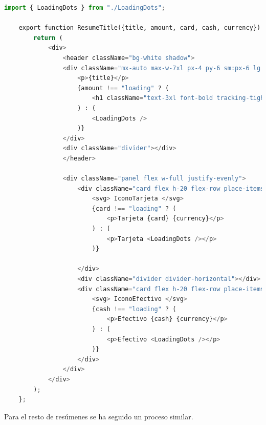 \begin{lstlisting}[language=Python, caption=Componente de React para el resumen de gastos, label=cod:resumen_gastos]
    import { LoadingDots } from "./LoadingDots";

    export function ResumeTitle({title, amount, card, cash, currency}) {
        return (
            <div>
                <header className="bg-white shadow">
                <div className="mx-auto max-w-7xl px-4 py-6 sm:px-6 lg:px-8">
                    <p>{title}</p>
                    {amount !== "loading" ? (
                        <h1 className="text-3xl font-bold tracking-tight text-gray-900">{amount} {currency}</h1>
                    ) : (
                        <LoadingDots />
                    )}
                </div>
                <div className="divider"></div>
                </header>
    
                <div className="panel flex w-full justify-evenly">
                    <div className="card flex h-20 flex-row place-items-center">
                        <svg> IconoTarjeta </svg>
                        {card !== "loading" ? (
                            <p>Tarjeta {card} {currency}</p>
                        ) : (
                            <p>Tarjeta <LoadingDots /></p>
                        )}
                        
                    </div>
                    <div className="divider divider-horizontal"></div>
                    <div className="card flex h-20 flex-row place-items-center">
                        <svg> IconoEfectivo </svg>
                        {cash !== "loading" ? (
                            <p>Efectivo {cash} {currency}</p>
                        ) : (
                            <p>Efectivo <LoadingDots /></p>
                        )}
                    </div>
                </div>
            </div>  
        );
    };
\end{lstlisting}

Para el resto de resúmenes se ha seguido un proceso similar. 

